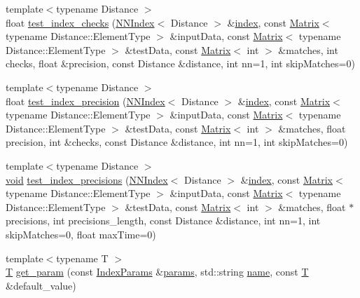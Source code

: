 \begin{DoxyCompactItemize}
\item 
{\footnotesize template$<$typename Distance $>$ }\\float \hyperlink{namespacecvflann_a1d76012b7d0afeea6c4b43ec48cda7a4}{test\-\_\-index\-\_\-checks} (\hyperlink{classcvflann_1_1NNIndex}{N\-N\-Index}$<$ Distance $>$ \&\hyperlink{core__c_8h_a750b5d744c39a06bfb13e6eb010e35d0}{index}, const \hyperlink{classcvflann_1_1Matrix}{Matrix}$<$ typename Distance\-::\-Element\-Type $>$ \&input\-Data, const \hyperlink{classcvflann_1_1Matrix}{Matrix}$<$ typename Distance\-::\-Element\-Type $>$ \&test\-Data, const \hyperlink{classcvflann_1_1Matrix}{Matrix}$<$ int $>$ \&matches, int checks, float \&precision, const Distance \&distance, int nn=1, int skip\-Matches=0)
\item 
{\footnotesize template$<$typename Distance $>$ }\\float \hyperlink{namespacecvflann_aff89fafb22b62a454cef8ce83960b89f}{test\-\_\-index\-\_\-precision} (\hyperlink{classcvflann_1_1NNIndex}{N\-N\-Index}$<$ Distance $>$ \&\hyperlink{core__c_8h_a750b5d744c39a06bfb13e6eb010e35d0}{index}, const \hyperlink{classcvflann_1_1Matrix}{Matrix}$<$ typename Distance\-::\-Element\-Type $>$ \&input\-Data, const \hyperlink{classcvflann_1_1Matrix}{Matrix}$<$ typename Distance\-::\-Element\-Type $>$ \&test\-Data, const \hyperlink{classcvflann_1_1Matrix}{Matrix}$<$ int $>$ \&matches, float precision, int \&checks, const Distance \&distance, int nn=1, int skip\-Matches=0)
\item 
{\footnotesize template$<$typename Distance $>$ }\\\hyperlink{legacy_8hpp_a8bb47f092d473522721002c86c13b94e}{void} \hyperlink{namespacecvflann_aa27ca9a7a0e97f3b09f781421b5ffa05}{test\-\_\-index\-\_\-precisions} (\hyperlink{classcvflann_1_1NNIndex}{N\-N\-Index}$<$ Distance $>$ \&\hyperlink{core__c_8h_a750b5d744c39a06bfb13e6eb010e35d0}{index}, const \hyperlink{classcvflann_1_1Matrix}{Matrix}$<$ typename Distance\-::\-Element\-Type $>$ \&input\-Data, const \hyperlink{classcvflann_1_1Matrix}{Matrix}$<$ typename Distance\-::\-Element\-Type $>$ \&test\-Data, const \hyperlink{classcvflann_1_1Matrix}{Matrix}$<$ int $>$ \&matches, float $\ast$precisions, int precisions\-\_\-length, const Distance \&distance, int nn=1, int skip\-Matches=0, float max\-Time=0)
\item 
{\footnotesize template$<$typename T $>$ }\\\hyperlink{calib3d_8hpp_a3efb9551a871ddd0463079a808916717}{T} \hyperlink{namespacecvflann_a6ea20e8aad20212544cb42368c1e5b5f}{get\-\_\-param} (const \hyperlink{namespacecvflann_a742b4c7076c21012054af74a9ee48289}{Index\-Params} \&\hyperlink{compat_8hpp_a0480a03ecc41b20cde376602531d9270}{params}, std\-::string \hyperlink{core__c_8h_add928d8eb85ea33a25a67db3406d4887}{name}, const \hyperlink{calib3d_8hpp_a3efb9551a871ddd0463079a808916717}{T} \&default\-\_\-value)

\end{DoxyCompactItemize}
